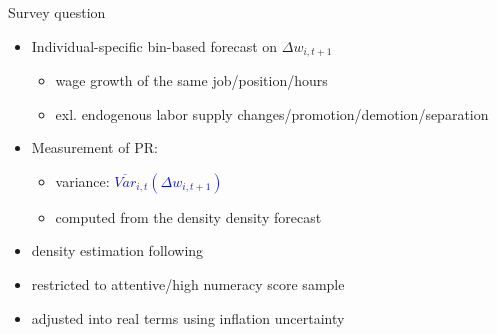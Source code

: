 \documentclass{beamer}
\begin{document}
\begin{frame}{Survey question}
	\begin{itemize}
		\item Individual-specific bin-based forecast on $\Delta w_{i,t+1}$
		\begin{itemize}
			\item wage growth of the same job/position/hours
				\item exl. endogenous labor supply changes/promotion/demotion/separation 
		\end{itemize} 
		\item  Measurement of PR: 
		\begin{itemize}
			\item variance: \textcolor{blue}{$\overline {Var}_{i,t}(\Delta w_{i,t+1})$}  
			\item computed from the density density forecast
		\end{itemize}
\item density estimation following \cite{engelberg_comparing_2009}			
\item restricted to attentive/high numeracy score sample
\item adjusted into real terms using inflation uncertainty 
\end{itemize}
\end{frame}
\end{document}
